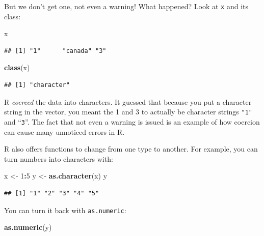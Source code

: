 \documentclass[
]{article}
\newenvironment{Shaded}{\begin{snugshade}}{\end{snugshade}}
\newcommand{\DecValTok}[1]{\textcolor[rgb]{0.00,0.00,0.81}{#1}}
\newcommand{\FunctionTok}[1]{\textcolor[rgb]{0.13,0.29,0.53}{\textbf{#1}}}
\newcommand{\NormalTok}[1]{#1}
\newcommand{\OtherTok}[1]{\textcolor[rgb]{0.56,0.35,0.01}{#1}}
\newcommand{\SpecialCharTok}[1]{\textcolor[rgb]{0.81,0.36,0.00}{\textbf{#1}}}
\begin{document}
But we don't get one, not even a warning! What happened? Look at
\texttt{x} and its class:

\begin{Shaded}
\begin{Highlighting}[]
\NormalTok{x}
\end{Highlighting}
\end{Shaded}

\begin{verbatim}
## [1] "1"      "canada" "3"
\end{verbatim}

\begin{Shaded}
\begin{Highlighting}[]
\FunctionTok{class}\NormalTok{(x)}
\end{Highlighting}
\end{Shaded}

\begin{verbatim}
## [1] "character"
\end{verbatim}

R \emph{coerced} the data into characters. It guessed that because you
put a character string in the vector, you meant the 1 and 3 to actually
be character strings \texttt{"1"} and ``\texttt{3}''. The fact that not
even a warning is issued is an example of how coercion can cause many
unnoticed errors in R.

R also offers functions to change from one type to another. For example,
you can turn numbers into characters with:

\begin{Shaded}
\begin{Highlighting}[]
\NormalTok{x }\OtherTok{\textless{}{-}} \DecValTok{1}\SpecialCharTok{:}\DecValTok{5}
\NormalTok{y }\OtherTok{\textless{}{-}} \FunctionTok{as.character}\NormalTok{(x)}
\NormalTok{y}
\end{Highlighting}
\end{Shaded}

\begin{verbatim}
## [1] "1" "2" "3" "4" "5"
\end{verbatim}

You can turn it back with \texttt{as.numeric}:

\begin{Shaded}
\begin{Highlighting}[]
\FunctionTok{as.numeric}\NormalTok{(y)}
\end{Highlighting}
\end{Shaded}
\end{document}
